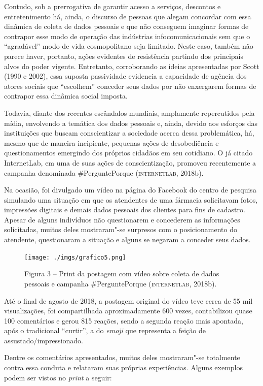 Contudo, sob a prerrogativa de garantir acesso a serviços, descontos e
entretenimento há, ainda, o discurso de pessoas que alegam concordar com
essa dinâmica de coleta de dados pessoais e que não conseguem imaginar
formas de contrapor esse modo de operação das indústrias
infocomunicacionais sem que o ``agradável'' modo de vida cosmopolitano
seja limitado. Neste caso, também não parece haver, portanto, ações
evidentes de resistência partindo dos principais alvos do poder vigente.
Entretanto, corroborando as ideias apresentadas por Scott (1990 e 2002),
essa suposta passividade evidencia a capacidade de agência dos atores
sociais que ``escolhem'' conceder seus dados por não enxergarem formas
de contrapor essa dinâmica social imposta.

Todavia, diante dos recentes escândalos mundiais, amplamente
repercutidos pela mídia, envolvendo a temática dos dados pessoais e,
ainda, devido aos esforços das instituições que buscam conscientizar a
sociedade acerca dessa problemática, há, mesmo que de maneira
incipiente, pequenas ações de desobediência e questionamentos emergindo
dos próprios cidadãos em seu cotidiano. O já citado InternetLab, em uma
de suas ações de conscientização, promoveu recentemente a campanha
denominada \#PerguntePorque (\textsc{internetlab}, 2018b).

Na ocasião, foi divulgado um vídeo na página do Facebook do centro de
pesquisa simulando uma situação em que os atendentes de uma fármacia
solicitavam fotos, impressões digitais e demais dados pessoais dos
clientes para fins de cadastro. Apesar de alguns indivíduos não
questionarem e concederem as informações solicitadas, muitos deles
mostraram"-se surpresos com o posicionamento do atendente, questionaram a
situação e alguns se negaram a conceder seus dados.

\begin{figure}[!ht]
\texttt{[image: ./imgs/grafico5.png]}
\caption{Figura 3 -- Print da postagem com vídeo sobre coleta de dados pessoais e campanha \#PerguntePorque (\textsc{internetlab}, 2018b).}
\end{figure}

Até o final de agosto de 2018, a postagem original do vídeo teve cerca
de 55 mil visualizações, foi compartilhada aproximadamente 600 vezes,
contabilizou quase 100 comentários e gerou 815 reações, sendo a segunda
reação mais apontada, após o tradicional ``curtir'', a do \emph{emoji}
que representa a feição de assustado/impressionado.

Dentre os comentários apresentados, muitos deles mostraram"-se totalmente
contra essa conduta e relataram suas próprias experiências. Alguns
exemplos podem ser vistos no \emph{print} a seguir:

